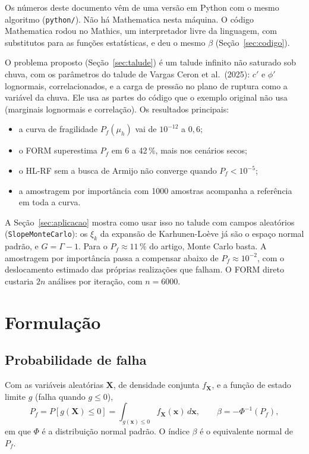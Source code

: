 \documentclass[11pt,a4paper]{article}
\begin{document}
Os números deste documento vêm de uma versão em Python com o mesmo algoritmo (\texttt{python/}). Não há Mathematica
nesta máquina. O código Mathematica rodou no Mathics, um interpretador livre da linguagem, com substitutos para as
funções estatísticas, e deu o mesmo $\beta$ (Seção~\ref{sec:codigo}).

O problema proposto (Seção~\ref{sec:talude}) é um talude infinito não saturado sob chuva, com os parâmetros do talude
de Vargas Ceron et al.\ (2025): $c'$ e $\phi'$ lognormais, correlacionados, e a carga de pressão no plano de ruptura
como a variável da chuva. Ele usa as partes do código que o exemplo original não usa (marginais lognormais e
correlação). Os resultados principais:
\begin{itemize}
  \item a curva de fragilidade $P_f(\mu_h)$ vai de $10^{-12}$ a $0{,}6$;
  \item o FORM superestima $P_f$ em 6 a 42\,\%, mais nos cenários secos;
  \item o HL-RF sem a busca de Armijo não converge quando $P_f < 10^{-5}$;
  \item a amostragem por importância com 1000 amostras acompanha a referência em toda a curva.
\end{itemize}

A Seção~\ref{sec:aplicacao} mostra como usar isso no talude com campos aleatórios (\texttt{SlopeMonteCarlo}): os
$\xi_k$ da expansão de Karhunen-Loève já são o espaço normal padrão, e $G = \Gamma - 1$. Para o $P_f \approx 11\,\%$
do artigo, Monte Carlo basta. A amostragem por importância passa a compensar abaixo de $P_f \approx 10^{-2}$, com o
deslocamento estimado das próprias realizações que falham. O FORM direto custaria $2n$ análises por iteração, com
$n = 6000$.

\section{Formulação}
\label{sec:formulacao}

\subsection{Probabilidade de falha}
Com as variáveis aleatórias $\bm X$, de densidade conjunta $f_{\bm X}$, e a função de estado limite $g$ (falha quando
$g \leq 0$),
\begin{equation}
  P_f = P[g(\bm X) \leq 0] = \int_{g(\bm x) \leq 0} f_{\bm X}(\bm x)\, d\bm x,
  \qquad \beta = -\Phi^{-1}(P_f),
\end{equation}
em que $\Phi$ é a distribuição normal padrão. O índice $\beta$ é o equivalente normal de $P_f$.
\end{document}
